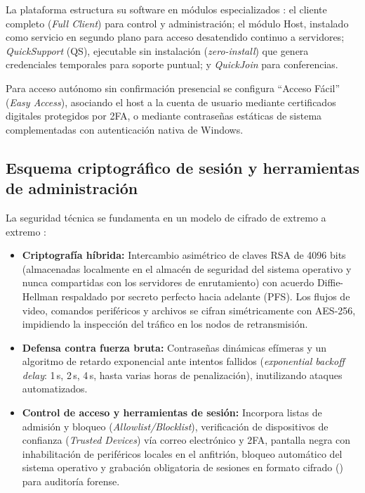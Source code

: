 \documentclass[12pt]{article}
\begin{document}
La plataforma estructura su software en módulos especializados \parencite{teamviewerManualRemoteControl}: el cliente completo (\textit{Full Client}) para control y administración; el módulo Host, instalado como servicio en segundo plano para acceso desatendido continuo a servidores; \textit{QuickSupport} (QS), ejecutable sin instalación (\textit{zero-install}) que genera credenciales temporales para soporte puntual; y \textit{QuickJoin} para conferencias.

Para acceso autónomo sin confirmación presencial se configura \enquote{Acceso Fácil} (\textit{Easy Access}), asociando el host a la cuenta de usuario mediante certificados digitales protegidos por 2FA, o mediante contraseñas estáticas de sistema complementadas con autenticación nativa de Windows.

\subsection{Esquema criptográfico de sesión y herramientas de administración}\label{sec:tvCriptografia}

La seguridad técnica se fundamenta en un modelo de cifrado de extremo a extremo \parencite{teamviewerSecurityWhitepaper}:
\begin{itemize}[noitemsep, topsep=4pt]
    \item \textbf{Criptografía híbrida:} Intercambio asimétrico de claves RSA de 4096 bits (almacenadas localmente en el almacén de seguridad del sistema operativo y nunca compartidas con los servidores de enrutamiento) con acuerdo Diffie-Hellman respaldado por secreto perfecto hacia adelante (PFS). Los flujos de video, comandos periféricos y archivos se cifran simétricamente con AES-256, impidiendo la inspección del tráfico en los nodos de retransmisión.
    \item \textbf{Defensa contra fuerza bruta:} Contraseñas dinámicas efímeras y un algoritmo de retardo exponencial ante intentos fallidos (\textit{exponential backoff delay}: 1\,s, 2\,s, 4\,s, hasta varias horas de penalización), inutilizando ataques automatizados.
    \item \textbf{Control de acceso y herramientas de sesión:} Incorpora listas de admisión y bloqueo (\textit{Allowlist/Blocklist}), verificación de dispositivos de confianza (\textit{Trusted Devices}) vía correo electrónico y 2FA, pantalla negra con inhabilitación de periféricos locales en el anfitrión, bloqueo automático del sistema operativo y grabación obligatoria de sesiones en formato cifrado () para auditoría forense.
\end{itemize}
\end{document}
